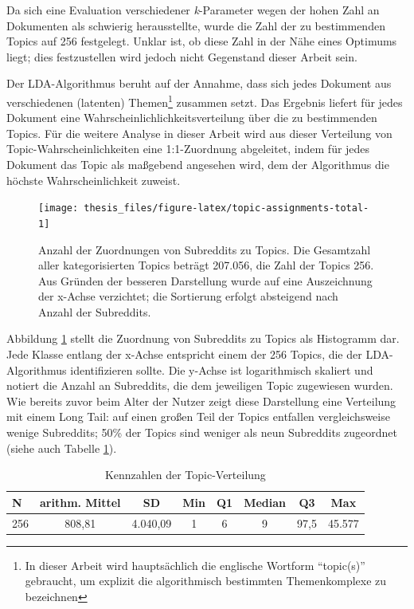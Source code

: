 \documentclass[11pt,a4paper,twoside]{article}
\let\rmarkdownfootnote\footnote%
\def\footnote{\protect\rmarkdownfootnote}
\begin{document}
Da sich eine Evaluation verschiedener \emph{k}-Parameter wegen der hohen
Zahl an Dokumenten als schwierig herausstellte, wurde die Zahl der zu
bestimmenden Topics auf 256 festgelegt. Unklar ist, ob diese Zahl in der
Nähe eines Optimums liegt; dies festzustellen wird jedoch nicht
Gegenstand dieser Arbeit sein.

Der LDA-Algorithmus beruht auf der Annahme, dass sich jedes Dokument aus
verschiedenen (latenten) Themen\footnote{In dieser Arbeit wird
  hauptsächlich die englische Wortform \enquote{topic(s)} gebraucht, um
  explizit die algorithmisch bestimmten Themenkomplexe zu bezeichnen}
zusammen setzt. Das Ergebnis liefert für jedes Dokument eine
Wahrscheinlichlichkeitsverteilung über die zu bestimmenden Topics. Für
die weitere Analyse in dieser Arbeit wird aus dieser Verteilung von
Topic-Wahrscheinlichkeiten eine 1:1-Zuordnung abgeleitet, indem für
jedes Dokument das Topic als maßgebend angesehen wird, dem der
Algorithmus die höchste Wahrscheinlichkeit zuweist.







\begin{figure}

{\centering \texttt{[image: thesis\_files/figure-latex/topic-assignments-total-1]} 

}

\caption{Anzahl der Zuordnungen von Subreddits
zu Topics. Die Gesamtzahl aller kategorisierten Topics beträgt 207.056,
die Zahl der Topics 256. Aus Gründen der besseren Darstellung wurde auf
eine Auszeichnung der x-Achse verzichtet; die Sortierung erfolgt
absteigend nach Anzahl der Subreddits.}\label{fig:topic-assignments-total}
\end{figure}

Abbildung \ref{fig:topic-assignments-total} stellt die Zuordnung von
Subreddits zu Topics als Histogramm dar. Jede Klasse entlang der x-Achse
entspricht einem der 256 Topics, die der LDA-Algorithmus identifizieren
sollte. Die y-Achse ist logarithmisch skaliert und notiert die Anzahl an
Subreddits, die dem jeweiligen Topic zugewiesen wurden. Wie bereits
zuvor beim Alter der Nutzer zeigt diese Darstellung eine Verteilung mit
einem Long Tail: auf einen großen Teil der Topics entfallen
vergleichsweise wenige Subreddits; 50\% der Topics sind weniger als neun
Subreddits zugeordnet (siehe auch Tabelle
\ref{tab:topic-assignments-summary}).



\begin{table}

\caption{\label{tab:topic-assignments-summary}Kennzahlen der Topic-Verteilung}
\centering
\begin{tabular}[t]{lccccccc}
\toprule
N & arithm. Mittel & SD & Min & Q1 & Median & Q3 & Max\\
\midrule
256 & 808,81 & 4.040,09 & 1 & 6 & 9 & 97,5 & 45.577\\
\bottomrule
\end{tabular}
\end{table}
\end{document}
